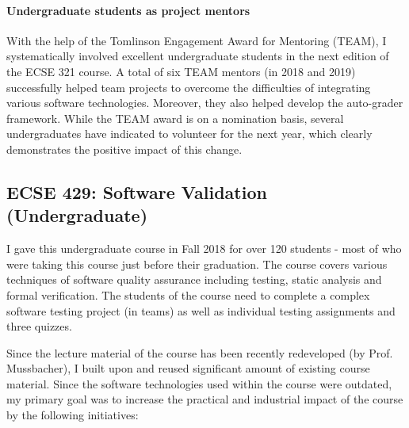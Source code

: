 \documentclass[a4paper,11pt]{report}
\begin{document}
\paragraph{Undergraduate students as project mentors}
With the help of the Tomlinson Engagement Award for Mentoring (TEAM), I systematically involved excellent undergraduate students in the next edition of the ECSE 321 course. A total of six TEAM mentors (in 2018 and 2019) successfully helped team projects to overcome the difficulties of integrating various software technologies. Moreover, they also helped develop the auto-grader framework. While the TEAM award is on a nomination basis, several undergraduates have indicated to volunteer for the next year, which clearly demonstrates the positive impact of this change.


\subsection{ECSE 429: Software Validation (Undergraduate)}

I gave this undergraduate course in Fall 2018 for over 120 students - most of who were taking this course just before their graduation. The course covers various techniques of software quality assurance including testing, static analysis and formal verification. The students of the course need to complete a complex software testing project (in teams) as well as individual testing assignments and three quizzes.

Since the lecture material of the course has been recently redeveloped (by Prof. Mussbacher), I built upon and reused significant amount of existing course material. Since the software technologies used within the course were outdated, my primary goal was to increase the practical and industrial impact of the course by the following initiatives:
\end{document}
